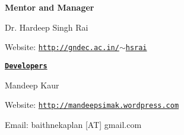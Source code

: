 {\bfseries Mentor and Manager}

Dr. Hardeep Singh Rai

Website\-: \href{http://gndec.ac.in/~hsrai}{\tt http\-://gndec.\-ac.\-in/$\sim$hsrai}

{\bfseries \href{https://github.com/GreatDevelopers/bakaplan/wiki/Contributors}{\tt Developers}}

Mandeep Kaur

Website\-: \href{http://mandeepsimak.wordpress.com}{\tt http\-://mandeepsimak.\-wordpress.\-com}

Email\-: baithnekaplan \mbox{[}A\-T\mbox{]} gmail.\-com 